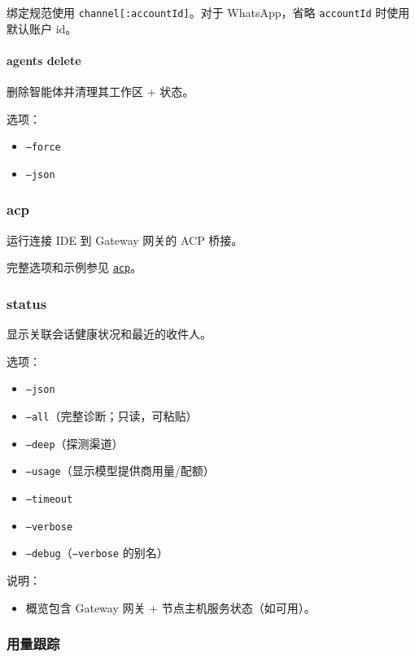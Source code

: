 绑定规范使用 \texttt{channel[:accountId]}。对于 WhatsApp，省略 \texttt{accountId} 时使用默认账户 id。

\paragraph{agents delete }


删除智能体并清理其工作区 + 状态。

选项：

\begin{itemize}
  \item \texttt{--force}
  \item \texttt{--json}
\end{itemize}


\subsubsection{acp}


运行连接 IDE 到 Gateway 网关的 ACP 桥接。

完整选项和示例参见 \href{/cli/acp}{\texttt{acp}}。

\subsubsection{status}


显示关联会话健康状况和最近的收件人。

选项：

\begin{itemize}
  \item \texttt{--json}
  \item \texttt{--all}（完整诊断；只读，可粘贴）
  \item \texttt{--deep}（探测渠道）
  \item \texttt{--usage}（显示模型提供商用量/配额）
  \item \texttt{--timeout }
  \item \texttt{--verbose}
  \item \texttt{--debug}（\texttt{--verbose} 的别名）
\end{itemize}


说明：

\begin{itemize}
  \item 概览包含 Gateway 网关 + 节点主机服务状态（如可用）。
\end{itemize}


\subsubsection{用量跟踪}



